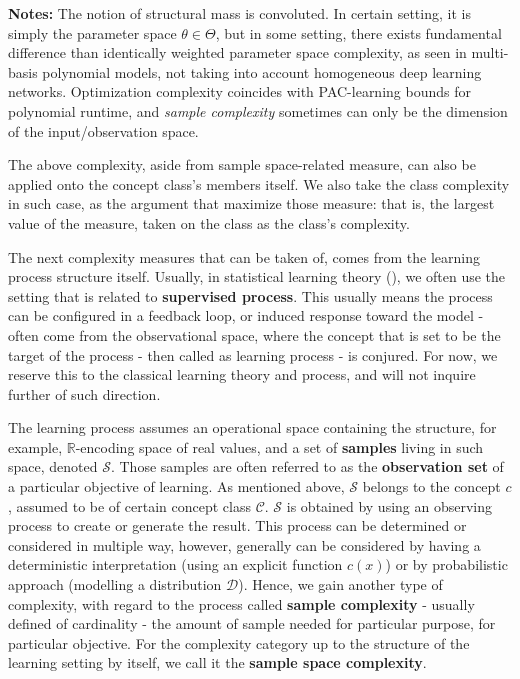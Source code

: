 \documentclass[10pt]{article} %
\begin{document}
\begin{table}[htb]
\begin{threeparttable}
    \begin{tablenotes}
      \footnotesize
      \item[] \textbf{Notes:} The notion of structural mass is convoluted. In certain setting, it is simply the parameter space $\theta\in\Theta$, but in some setting, there exists fundamental difference than identically weighted parameter space complexity, as seen in multi-basis polynomial models, not taking into account homogeneous deep learning networks. Optimization complexity coincides with PAC-learning bounds for polynomial runtime, and \textit{sample complexity} sometimes can only be the dimension of the input/observation space.
    \end{tablenotes}
  \end{threeparttable}
\end{table}

The above complexity, aside from sample space-related measure, can also be applied onto the concept class's members itself. We also take the class complexity in such case, as the argument that maximize those measure: that is, the largest value of the measure, taken on the class as the class's complexity. 

The next complexity measures that can be taken of, comes from the learning process structure itself. Usually, in statistical learning theory (\cite{STL_Hajek_Maxim_2021,10.5555/2371238,10.5555/2621980}), we often use the setting that is related to \textbf{supervised process}. This usually means the process can be configured in a feedback loop, or induced response toward the model - often come from the observational space, where the concept that is set to be the target of the process - then called as learning process - is conjured. For now, we reserve this to the classical learning theory and process, and will not inquire further of such direction. 

The learning process assumes an operational space containing the structure, for example, $\mathbb{R}$-encoding space of real values, and a set of \textbf{samples} living in such space, denoted $\mathcal{S}$. Those samples are often referred to as the \textbf{observation set} of a particular objective of learning. As mentioned above, $\mathcal{S}$ belongs to the concept $c$, assumed to be of certain concept class $\mathcal{C}$. $\mathcal{S}$ is obtained by using an observing process to create or generate the result. This process can be determined or considered in multiple way, however, generally can be considered by having a deterministic interpretation (using an explicit function $c(x)$) or by probabilistic approach (modelling a distribution $\mathcal{D}$). Hence, we gain another type of complexity, with regard to the process called \textbf{sample complexity} - usually defined of cardinality - the amount of sample needed for particular purpose, for particular objective. For the complexity category up to the structure of the learning setting by itself, we call it the \textbf{sample space complexity}. 
\end{document}
